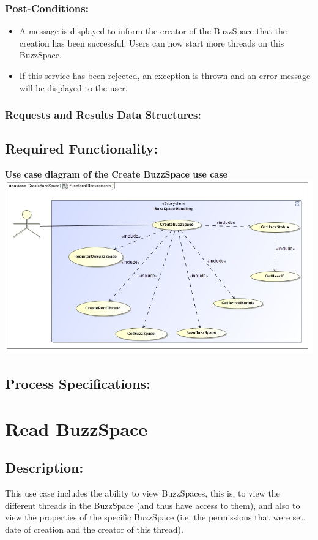 \documentclass[a4paper,11pt]{article}
\begin{document}
\subsubsection*{Post-Conditions:}
\begin{itemize}
	\item A message is displayed to inform the creator of the BuzzSpace that the creation has been successful. Users can now start more threads on this BuzzSpace.
	\item If this service has been rejected, an exception is thrown and an error message will be displayed to the user.
\end{itemize}
\subsubsection*{Requests and Results Data Structures:}
\subsection{Required Functionality:} 
\textbf{Use case diagram of the Create BuzzSpace use case}\\ 
\includegraphics[width=1\linewidth]{./Images/BuzzSpaceHandling/buzzSpaceCreation.jpg}\\
\subsection{Process Specifications:} 

\section{Read BuzzSpace}
\subsection*{Description:}This use case includes the ability to view BuzzSpaces, this is, to view the different threads in the BuzzSpace (and thus have access to them), and also to view the
properties of the specific BuzzSpace (i.e. the permissions that were set, date of creation and the creator of this thread).
\end{document}
